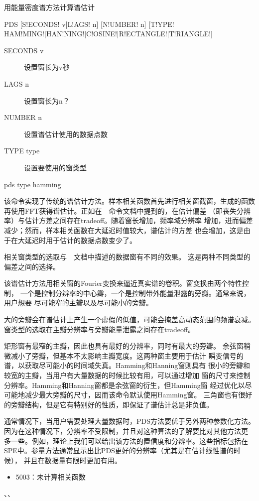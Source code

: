 \label{spe:pds}

用能量密度谱方法计算谱估计

\begin{SACSTX}
PDS [S!ECONDS! v|L!AGS! n] [N!UMBER! n]
    [T!YPE! HAM!MING!|HAN!NING!|C!OSINE!|R!ECTANGLE!|T!RIANGLE!]
\end{SACSTX}

\begin{description}
\item [SECONDS v] 设置窗长为v秒
\item [LAGS n] 设置窗长为n？
\item [NUMBER n] 设置谱估计使用的数据点数
\item [TYPE type] 设置要使用的窗类型
\end{description}

\begin{SACDFT}
pds type hamming
\end{SACDFT}

该命令实现了传统的谱估计方法。样本相关函数首先进行相关窗截窗，生成的函数
再使用FFT获得谱估计。正如在~~命令文档中提到的，在估计偏差
（即丧失分辨率）与估计方差之间存在tradeoff。随着窗长增加，频率域分辨率
增加，进而偏差减少；然而，样本相关函数在大延迟时值较大，谱估计的方差
也会增加，这是由于在大延迟时用于估计的数据点数变少了。

相关窗类型的选取与~~文档中描述的数据窗有不同的效果。
这是两种不同类型的偏差之间的选择。

该谱估计方法用相关窗的Fourier变换来逼近真实谱的卷积。窗变换由两个特性控制，
一个是控制分辨率的中心瓣，一个是控制带外能量泄露的旁瓣。通常来说，用户想要
尽可能窄的主瓣以及尽可能小的旁瓣。

大的旁瓣会在谱估计上产生一个虚假的低值，可能会掩盖高动态范围的频谱衰减。
窗类型的选取在主瓣分辨率与旁瓣能量泄露之间存在tradeoff。

矩形窗有最窄的主瓣，因此也具有最好的分辨率，同时有最大的旁瓣。
余弦窗稍微减小了旁瓣，但基本不太影响主瓣宽度。这两种窗主要用于估计
瞬变信号的谱，以获取尽可能小的时间域失真。Hamming和Hanning窗则具有
很小的旁瓣和较宽的主瓣，当用户有大量数据的时候比较有用，可以通过增加
窗的尺寸来控制分辨率。Hamming和Hanning窗都是余弦窗的衍生，但Hamming窗
经过优化以尽可能地减少最大旁瓣的尺寸，因而该命令默认使用Hamming窗。
三角窗也有很好的旁瓣结构，但是它有特别好的性质，即保证了谱估计总是非负值。

通常情况下，当用户需要处理大量数据时，PDS方法要优于另外两种参数化方法。
因为在这种情况下，分辨率不受限制，并且对这种算法的了解要比对其他方法更
多一些。例如，理论上我们可以给出该方法的置信度和分辨率。这些指标包括在
SPE中。参量方法通常显示出比PDS更好的分辨率（尤其是在估计线性谱的时候），
并且在数据量有限时更加有用。

\begin{itemize}
\item 5003：未计算相关函数
\end{itemize}

、、
